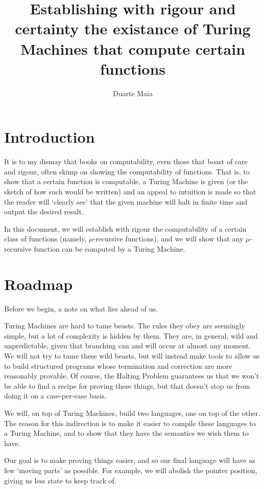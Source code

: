 \documentclass{article}
\title{Establishing with rigour and certainty the existance of Turing Machines that compute certain functions}
\author{Duarte Maia}
\date{}
\begin{document}
	\maketitle

	\section{Introduction}

	It is to my dismay that books on computability, even those that boast of care and rigour, often skimp on showing the computability of functions. That is, to show that a certain function is computable, a Turing Machine is given (or the sketch of how such would be written) and an appeal to intuition is made so that the reader will `clearly see' that the given machine will halt in finite time and output the desired result.
	
	In this document, we will establish with rigour the computability of a certain class of functions (namely, $\mu$-recursive functions), and we will show that any $\mu$-recursive function can be computed by a Turing Machine.
	
	\section{Roadmap}
	
	Before we begin, a note on what lies ahead of us.
	
	Turing Machines are hard to tame beasts. The rules they obey are seemingly simple, but a lot of complexity is hidden by them. They are, in general, wild and unpredictable, given that branching can and will occur at almost any moment. We will not try to tame these wild beasts, but will instead make tools to allow us to build structured programs whose termination and correction are more reasonably provable. Of course, the Halting Problem guarantees us that we won't be able to find a recipe for proving these things, but that doesn't stop us from doing it on a case-per-case basis.
	
	We will, on top of Turing Machines, build two languages, one on top of the other. %
	The reason for this indirection is to make it easier to compile these languages to a Turing Machine, and to show that they have the semantics we wish them to have.
	
	Our goal is to make proving things easier, and so our final language will have as few `moving parts' as possible. For example, we will abolish the pointer position, giving us less state to keep track of.
	
\end{document}
